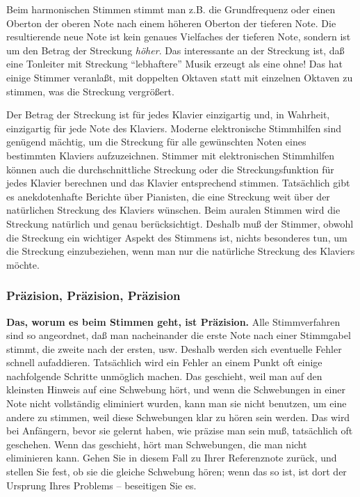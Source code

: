Beim harmonischen Stimmen stimmt man z.B. die Grundfrequenz oder einen Oberton der oberen Note nach einem höheren Oberton der tieferen Note.
Die resultierende neue Note ist kein genaues Vielfaches der tieferen Note, sondern ist um den Betrag der Streckung \textit{höher}.
Das interessante an der Streckung ist, daß eine Tonleiter mit Streckung \enquote{lebhaftere} Musik erzeugt als eine ohne!
Das hat einige Stimmer veranlaßt, mit doppelten Oktaven statt mit einzelnen Oktaven zu stimmen, was die Streckung vergrößert.

Der Betrag der Streckung ist für jedes Klavier einzigartig und, in Wahrheit, einzigartig für jede Note des Klaviers.
Moderne elektronische Stimmhilfen sind genügend mächtig, um die Streckung für alle gewünschten Noten eines bestimmten Klaviers aufzuzeichnen.
Stimmer mit elektronischen Stimmhilfen können auch die durchschnittliche Streckung oder die Streckungsfunktion für jedes Klavier berechnen und das Klavier entsprechend stimmen.
Tatsächlich gibt es anekdotenhafte Berichte über Pianisten, die eine Streckung weit über der natürlichen Streckung des Klaviers wünschen.
Beim auralen Stimmen wird die Streckung natürlich und genau berücksichtigt.
Deshalb muß der Stimmer, obwohl die Streckung ein wichtiger Aspekt des Stimmens ist, nichts besonderes tun, um die Streckung einzubeziehen, wenn man nur die natürliche Streckung des Klaviers möchte.
 

\label{c2_5l}
\subsubsection{Präzision, Präzision, Präzision}
\label{c2_5_prae} 

\textbf{Das, worum es beim Stimmen geht, ist Präzision.}
Alle Stimmverfahren sind so angeordnet, daß man nacheinander die erste Note nach einer Stimmgabel stimmt, die zweite nach der ersten, usw.
Deshalb werden sich eventuelle Fehler schnell aufaddieren.
Tatsächlich wird ein Fehler an einem Punkt oft einige nachfolgende Schritte unmöglich machen.
Das geschieht, weil man auf den kleinsten Hinweis auf eine Schwebung hört, und wenn die Schwebungen in einer Note nicht vollständig eliminiert wurden, kann man sie nicht benutzen, um eine andere zu stimmen, weil diese Schwebungen klar zu hören sein werden.
Das wird bei Anfängern, bevor sie gelernt haben, wie präzise man sein muß, tatsächlich oft geschehen.
Wenn das geschieht, hört man Schwebungen, die man nicht eliminieren kann.
Gehen Sie in diesem Fall zu Ihrer Referenznote zurück, und stellen Sie fest, ob sie die gleiche Schwebung hören; wenn das so ist, ist dort der Ursprung Ihres Problems -- beseitigen Sie es.

